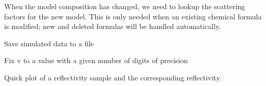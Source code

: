 \documentclass[letterpaper,10pt,english]{sphinxmanual}
\begin{document}
\begin{fulllineitems}
\begin{fulllineitems}
\label{api/experiment:refl1d.experiment.MixedExperiment.update}
\end{fulllineitems}


\begin{fulllineitems}
\label{api/experiment:refl1d.experiment.MixedExperiment.update_composition}
When the model composition has changed, we need to lookup the
scattering factors for the new model.  This is only needed
when an existing chemical formula is modified; new and
deleted formulas will be handled automatically.

\end{fulllineitems}


\begin{fulllineitems}
\label{api/experiment:refl1d.experiment.MixedExperiment.write_data}
Save simulated data to a file

\end{fulllineitems}


\end{fulllineitems}


\begin{fulllineitems}
\label{api/experiment:refl1d.experiment.nice}
Fix v to a value with a given number of digits of precision

\end{fulllineitems}


\begin{fulllineitems}
\label{api/experiment:refl1d.experiment.plot_sample}
Quick plot of a reflectivity sample and the corresponding reflectivity.

\end{fulllineitems}
\end{document}
